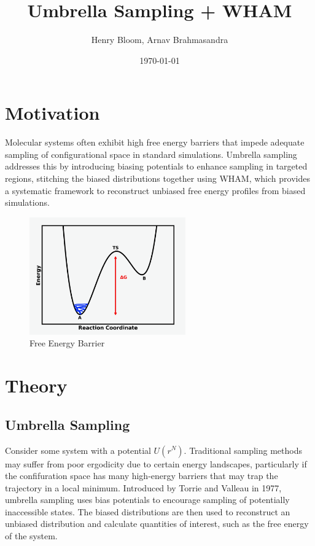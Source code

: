 \documentclass{article}
\title{Umbrella Sampling + WHAM}
\author{Henry Bloom, Arnav Brahmasandra}
\date{\today}
\begin{document}
\maketitle

\section{Motivation}
Molecular systems often exhibit high free energy barriers that impede adequate sampling of configurational space in standard simulations. 
Umbrella sampling addresses this by introducing biasing potentials to enhance sampling in targeted regions, stitching the biased distributions together using WHAM, which provides a systematic framework to reconstruct unbiased free energy profiles from biased simulations. 

\begin{figure}[h]%
    \centering
    \includegraphics[width=0.6\textwidth]{images/motivation_img.png}
    \caption{Free Energy Barrier}%
    \label{fig:free_energy_barrier}%
\end{figure}

\section{Theory}

\subsection{Umbrella Sampling}
Consider some system with a potential $U(r^N)$. 
Traditional sampling methods may suffer from poor ergodicity due to certain energy landscapes, particularly if the confifuration space has many high-energy barriers that may trap the trajectory in a local minimum.
Introduced by Torrie and Valleau in 1977, umbrella sampling uses bias potentials to encourage sampling of potentially inaccessible states.
The biased distributions are then used to reconstruct an unbiased distribution and calculate quantities of interest, such as the free energy of the system.
\end{document}
